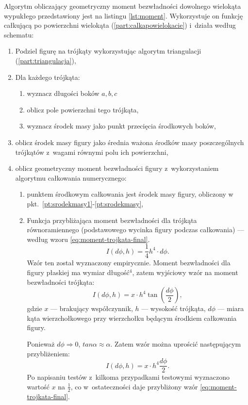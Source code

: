 Algorytm obliczający geometryczny moment bezwładności dowolnego wielokąta wypukłego przedstawiony jest na listingu \ref{lst:moment}. Wykorzystuje on funkcję całkującą po powierzchni wielokąta (\ref{part:calkapowielokacie}) i~działa według schematu:
\begin{enumerate}
	\item \label {pt:srodekmasy1} Podziel figurę na trójkąty wykorzystując algorytm triangulacji (\ref{part:triangulacja}),
	\item Dla każdego trójkąta: 
	\begin{enumerate}
		\item wyznacz długości boków $a, b, c$
		\item oblicz pole powierzchni tego trójkąta,
		\item wyznacz środek masy jako punkt przecięcia środkowych boków,
	\end{enumerate}
	\item \label{pt:srodekmasy} oblicz środek masy figury jako średnia ważona środków masy poszczególnych trójkątów z~wagami równymi polu ich powierzchni,
	\item oblicz geometryczny moment bezwładności figury z~wykorzystaniem algorytmu całkowania numerycznego:
	\begin{enumerate}
		\item punktem środkowym całkowania jest środek masy figury, obliczony w pkt.~\ref{pt:srodekmasy1}-\ref{pt:srodekmasy},
		\item Funkcja przybliżająca moment bezwładności dla trójkąta równoramiennego (podstawowego wycinka figury podczas całkowania) --- według wzoru \ref{eq:moment-trojkata-final}.
		\begin{equation}
		\label{eq:moment-trojkata-final}
		I(d\phi, h) = \frac{1}{4} h^4 \cdot d\phi.
		\end{equation}
		Wzór ten został wyznaczony empirycznie. Moment bezwładności dla figury płaskiej ma wymiar długość$^4$, zatem wyjściowy wzór na moment bezwładności trójkąta:
		\begin{equation}
		I(d\phi, h) = x \cdot h^4 \tan(\frac{d\phi}{2}),
		\end{equation}
		gdzie $x$ --- brakujący współczynnik, $h$ --- wysokość trójkąta, $d\phi$ --- miara kąta wierzchołkowego przy wierzchołku będącym środkiem całkowania figury.
		
		Ponieważ $d\phi \Rightarrow 0$, $tan\alpha \approx \alpha$. Zatem wzór można uprościć następującym przybliżeniem:
		\begin{equation}
				I(d\phi, h) = x \cdot h^4 \frac{d\phi}{2}.
		\end{equation}
		Po napisaniu testów z~kilkoma przypadkami testowymi wyznaczono wartość $x$ na $\frac{1}{2}$, co w~ostateczności daje przybliżony wzór  \ref{eq:moment-trojkata-final}.
	\end{enumerate}
\end{enumerate}
